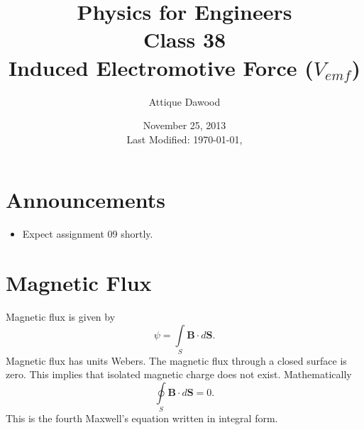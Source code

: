 \documentclass[12pt,a4paper]{article}
\title{\vspace{-3cm}Physics for Engineers\\Class 38\\Induced Electromotive Force ($V_{emf}$)}
\author{Attique Dawood}
\date{November 25, 2013\\[0.2cm] Last Modified: \today, \currenttime}
\begin{document}
\maketitle
\section{Announcements}
\begin{itemize}
\item Expect assignment 09 shortly.
\end{itemize}
\section{Magnetic Flux}
Magnetic flux is given by
\begin{equation}
\psi=\int\limits_{S}\textbf{B}\cdot d{\textbf{S}}.
\end{equation}
Magnetic flux has units Webers. The magnetic flux through a closed surface is zero. This implies that isolated magnetic charge does not exist. Mathematically
\begin{equation}
\oint\limits_{S}\textbf{B}\cdot d{\textbf{S}}=0.
\end{equation}
This is the fourth Maxwell's equation written in integral form.
\end{document}
